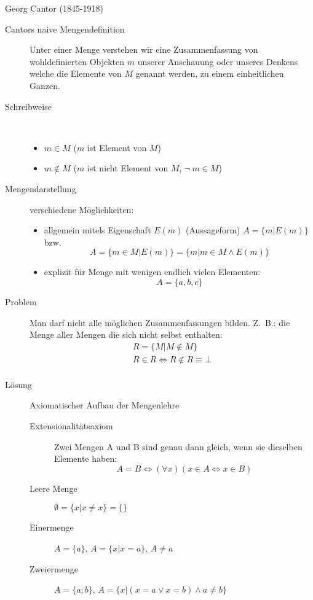 Georg Cantor (1845-1918)
\begin{description}
    \item[Cantors naive Mengendefinition] Unter einer Menge verstehen wir eine Zusammenfassung von wohldefinierten Objekten $m$ unserer Anschauung oder unseres Denkens welche die Elemente von $M$ genannt werden, zu einem einheitlichen Ganzen.
    \item[Schreibweise]\
    \begin{itemize}
        \item $m \in M$ ($m$ ist Element von $M$)
        \item $m \not\in M$ ($m$ ist nicht Element von $M$, $\neg\ m \in M$)
    \end{itemize}
    \item[Mengendarstellung] verschiedene Möglichkeiten:
    \begin{itemize}
        \item allgemein mitels Eigenschaft $E(m)$ (Aussageform) $A=\lbrace m|E(m) \rbrace$ bzw.
        \[A = \lbrace m \in M | E(m) \rbrace = \lbrace m | m \in M \wedge E(m) \rbrace\]
        \item explizit für Menge mit wenigen endlich vielen Elementen:
        \[A=\lbrace a, b, c\rbrace\]
    \end{itemize}
    \item[Problem] Man darf nicht alle möglichen Zusammenfassungen bilden.
    Z.~B.: die Menge aller Mengen die sich nicht selbst enthalten:
    \begin{gather*}
        R=\lbrace M | M \not \in M \rbrace\\
        R \in R \Leftrightarrow R \not \in R \equiv \bot\\
    \end{gather*}
    \item[Lösung] Axiomatischer Aufbau der Mengenlehre
    \begin{description}
        \item[Extensionalitätsaxiom] Zwei Mengen A und B sind genau dann gleich, wenn sie dieselben Elemente haben:
        \[A = B \Leftrightarrow (\forall x)(x \in A \Leftrightarrow x \in B)\]
        \item[Leere Menge] $\emptyset = \lbrace x | x \not = x\rbrace = \lbrace\rbrace$
        \item[Einermenge] $A=\lbrace a \rbrace$, $A = \lbrace x | x = a \rbrace$, $A \not = a$
        \item[Zweiermenge] $A=\lbrace a; b \rbrace$, $A = \lbrace x|(x=a \vee x=b) \wedge a \not = b \rbrace$

\end{description}
\end{description}
